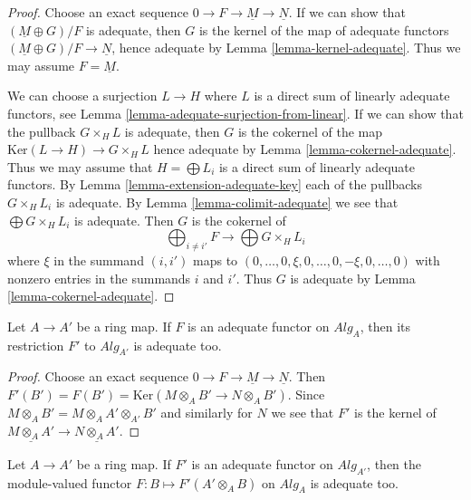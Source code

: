 \begin{proof}
Choose an exact sequence $0 \to F \to \underline{M} \to \underline{N}$.
If we can show that $(\underline{M} \oplus G)/F$ is adequate, then
$G$ is the kernel of the map of adequate functors
$(\underline{M} \oplus G)/F \to \underline{N}$, hence
adequate by
Lemma \ref{lemma-kernel-adequate}.
Thus we may assume $F = \underline{M}$.

\medskip\noindent
We can choose a surjection $L \to H$ where $L$ is a direct sum of
linearly adequate functors, see
Lemma \ref{lemma-adequate-surjection-from-linear}.
If we can show that the pullback $G \times_H L$ is adequate, then
$G$ is the cokernel of the map $\text{Ker}(L \to H) \to G \times_H L$
hence adequate by
Lemma \ref{lemma-cokernel-adequate}.
Thus we may assume that $H = \bigoplus L_i$ is a direct sum of
linearly adequate functors. By
Lemma \ref{lemma-extension-adequate-key}
each of the pullbacks $G \times_H L_i$ is adequate. By
Lemma \ref{lemma-colimit-adequate}
we see that $\bigoplus G \times_H L_i$ is adequate.
Then $G$ is the cokernel of
$$
\bigoplus\nolimits_{i \not = i'} F \longrightarrow
\bigoplus G \times_H L_i
$$
where $\xi$ in the summand $(i, i')$ maps to
$(0, \ldots, 0, \xi, 0, \ldots, 0, -\xi, 0, \ldots, 0)$
with nonzero entries in the summands $i$ and $i'$.
Thus $G$ is adequate by
Lemma \ref{lemma-cokernel-adequate}.
\end{proof}

\begin{lemma}
\label{lemma-base-change-adequate}
Let $A \to A'$ be a ring map. If $F$ is an adequate functor on
$\textit{Alg}_A$, then its restriction $F'$ to
$\textit{Alg}_{A'}$ is adequate too.
\end{lemma}

\begin{proof}
Choose an exact sequence $0 \to F \to \underline{M} \to \underline{N}$.
Then $F'(B') = F(B') = \text{Ker}(M \otimes_A B' \to N \otimes_A B')$.
Since $M \otimes_A B' = M \otimes_A A' \otimes_{A'} B'$ and similarly
for $N$ we see that $F'$ is the kernel of
$\underline{M \otimes_A A'} \to \underline{N \otimes_A A'}$.
\end{proof}

\begin{lemma}
\label{lemma-pushforward-adequate}
Let $A \to A'$ be a ring map. If $F'$ is an adequate functor on
$\textit{Alg}_{A'}$, then the module-valued functor
$F : B \mapsto F'(A' \otimes_A B)$ on $\textit{Alg}_A$ is adequate too.
\end{lemma}


